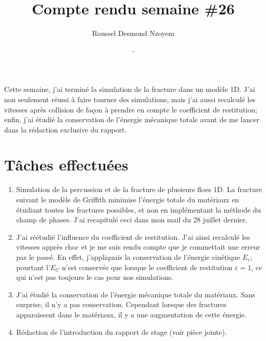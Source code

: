 \documentclass[
  french,
	11pt, %
]{fphw}
\title{\sf\bfseries Compte rendu semaine \#26} %
\author{Roussel Desmond Nzoyem} %
\date{\DTMdisplaydate{2021}{7}{28}{-1} - \DTMdisplaydate{2021}{8}{03}{-1}} %
\institute{Sorbonne Université \\ Laboratoire Jacques-Louis Lions} %
\begin{document}
\maketitle %



Cette semaine, j'ai terminé la simulation de la fracture dans un modèle 1D. J'ai non seulement réussi à faire tourner des simulations, mais j'ai aussi recalculé les vitesses après collision de façon à prendre en compte le coefficient de restitution; enfin, j'ai étudié la conservation de l'énergie mécanique totale avant de me lancer dans la rédaction exclusive du rapport.



\section*{Tâches effectuées}


\begin{enumerate}
  \item Simulation de la percussion et de la fracture de plusieurs floes 1D. La fracture suivant le modèle de Griffith minimise l'énergie totale du matériaux en étudiant toutes les fractures possibles, et non en implémentant la méthode du champ de phases. J'ai recapitulé ceci dans mon mail du 28 juillet dernier.
  \item J'ai réétudié l'influence du coefficient de restitution. J'ai ainsi recalculé les vitesses apprès choc et je me suis rendu compte que je commettait une erreur par le passé. En effet, j'appliquais la conservation de l'énergie cinétique $E_c$; pourtant l'$E_C$ n'est conservée que lorsque le coefficient de restitution $\varepsilon = 1$, ce qui n'est pas toujours le cas pour nos simulations. 
  \item J'ai étudié la conservation de l'énergie mécanique totale du matériaux. Sans surprise, il n'y a pas conservation. Cependant lorsque des fractures apparaissent dans le matériaux, il y a une augmentation de cette énergie. 
  \item Rédaction de l'introduction du rapport de stage (voir pièce jointe).
\end{enumerate}
\end{document}

